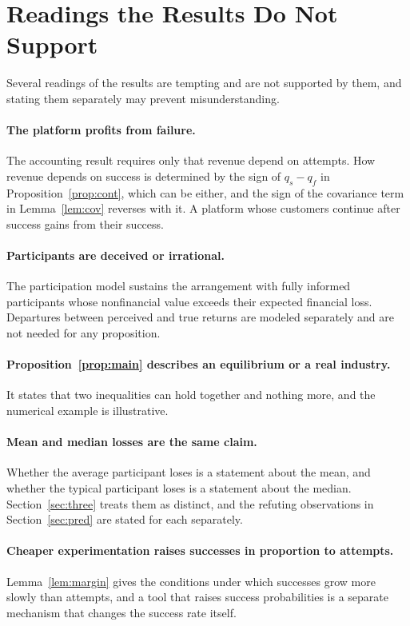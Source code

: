 \documentclass[11pt]{article}
\theoremstyle{remark}
\begin{document}
\section{Readings the Results Do Not Support}\label{sec:misread}

Several readings of the results are tempting and are not supported by them, and stating them separately may prevent misunderstanding.

\paragraph{The platform profits from failure.} The accounting result requires only that revenue depend on attempts. How revenue depends on success is determined by the sign of $q_s-q_f$ in Proposition~\ref{prop:cont}, which can be either, and the sign of the covariance term in Lemma~\ref{lem:cov} reverses with it. A platform whose customers continue after success gains from their success.

\paragraph{Participants are deceived or irrational.} The participation model sustains the arrangement with fully informed participants whose nonfinancial value exceeds their expected financial loss. Departures between perceived and true returns are modeled separately and are not needed for any proposition.

\paragraph{Proposition~\ref{prop:main} describes an equilibrium or a real industry.} It states that two inequalities can hold together and nothing more, and the numerical example is illustrative.

\paragraph{Mean and median losses are the same claim.} Whether the average participant loses is a statement about the mean, and whether the typical participant loses is a statement about the median. Section~\ref{sec:three} treats them as distinct, and the refuting observations in Section~\ref{sec:pred} are stated for each separately.

\paragraph{Cheaper experimentation raises successes in proportion to attempts.} Lemma~\ref{lem:margin} gives the conditions under which successes grow more slowly than attempts, and a tool that raises success probabilities is a separate mechanism that changes the success rate itself.
\end{document}
